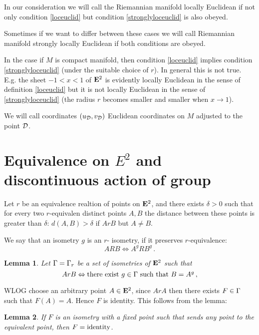 \documentclass[12pt]{article}
\theoremstyle{theorem}
\theoremstyle{lemma}
\newtheorem{lm}{Lemma}
\numberwithin{equation}{section}
\begin{document}
In our consideration we will call the Riemannian manifold
locally Euclidean if not only condition \eqref{loceuclid}
but condition \eqref{stronglyloceuclid} is also obeyed. 

Sometimes if we want to differ between these cases we will call
Riemannian manifold strongly locally Euclidean if both conditions
are obeyed.


In the case if $M$ is compact manifold, then  condition
\eqref{loceuclid} implies condition \eqref{stronglyloceuclid}
(under the suitable choice of $r$). In general this is not true.
E.g. the sheet
   $-1<x<1$ of ${\bf E}^2$ is evidently locally Euclidean in the sense
of definition \eqref{loceuclid} but it is not locally Euclidean
in the sense of \eqref{stronglyloceuclid} (the radius $r$
becomes smaller and smaller when $x\to 1$).

We will call coordinates $(u_{\cal D},v_{\cal D})$
Euclidean coordinates on $M$ adjusted to the point ${\cal D}$.





\section {Equivalence on $E^2$ and discontinuous action of group}




   Let $r$ be an equivalence realtion of points on ${\bf E}^2$,
and  there exists $\delta>0$ such that
for every two $r$-equivalen distinct  points $A,B$ 
 the distance between these points
is greater than $\delta$: $d(A,B)>\delta$ if $ArB$
but $A\not=B$.

   We say that  an isometry $g$ is an $r$- isometry,
if it preserves $r$-equivalence:
              $$
    ARB\Leftrightarrow  A^gRB^g\,.
              $$
\begin{lm}
Let  ${\Gamma}={\Gamma}_r$ be a set of isometries of ${\bf E}^2$
such that
       \begin{equation*}
      ArB \Leftrightarrow \hbox{there exist $g\in {\Gamma}$
such that $B=A^g$}\,,
\end{equation*}

\end{lm}


  WLOG  choose an arbitrary point $A\in {\bf E}^2$,
since $ArA$ then there exists $F\in {\Gamma}$ such that
$F(A)=A$. Hence $F$ is identity.  This follows from the lemma:


  \begin{lm}
If $F$ is an isometry with a fixed point
such that
sends any point to the equivalent point,
then  $F={\rm identity}$.
 \end{lm}
\end{document}

